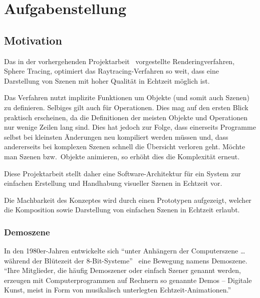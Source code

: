 
\chapter{Aufgabenstellung}
\label{chap:scope}

\section{Motivation}
\label{sec:motivation}

Das in der vorhergehenden
Projektarbeit~\cite{osterwalder_sven_volume_2016} vorgestellte
Renderingverfahren, Sphere Tracing, optimiert das  Raytracing-Verfahren so weit, dass eine Darstellung von
Szenen mit hoher Qualität in Echtzeit möglich ist.

Das Verfahren nutzt implizite Funktionen um Objekte (und somit auch
Szenen) zu definieren. Selbiges gilt auch für Operationen. Dies mag auf
den ersten Blick praktisch erscheinen, da die Definitionen der meisten Objekte
und Operationen nur wenige Zeilen lang sind. Dies hat jedoch zur Folge, dass
einerseits Programme selbst bei kleinsten Änderungen neu kompiliert werden
müssen und, dass andererseits bei komplexen Szenen schnell die Übersicht
verloren geht. Möchte man Szenen bzw.\ Objekte animieren, so erhöht dies die
Komplexität erneut.

Diese Projektarbeit stellt daher eine Software-Architektur für ein System zur
einfachen Erstellung und Handhabung visueller Szenen in Echtzeit vor.

Die Machbarkeit des  Konzeptes wird
durch einen Prototypen aufgezeigt, welcher die Komposition sowie Darstellung
von einfachen Szenen in Echtzeit erlaubt.

\subsection{Demoszene}
\label{subsec:demoscene}

In den 1980er-Jahren entwickelte sich ``unter Anhängern der
Computerszene \dots{} während der Blütezeit der
8-Bit-Systeme''~\parencite{wikipedia_foundation_demoszene_2015} eine Bewegung
namens Demoszene. ``Ihre Mitglieder, die häufig Demoszener oder einfach
Szener genannt werden, erzeugen mit Computerprogrammen auf Rechnern so
genannte Demos – Digitale Kunst, meist in Form von musikalisch
unterlegten
Echtzeit-Animationen.''~\parencite{wikipedia_foundation_demoszene_2015}

